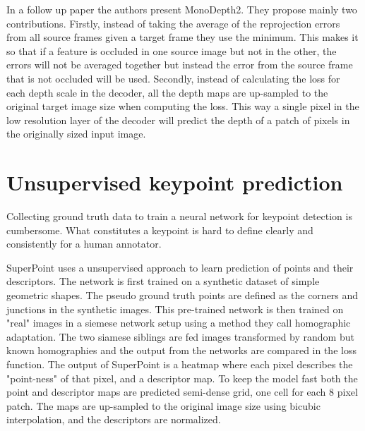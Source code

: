 
In a follow up paper\cite{monodepth2} the authors present MonoDepth2. They propose mainly two contributions. Firstly, instead of taking the average of the reprojection errors from all source frames given a target frame they use the minimum. This makes it so that if a feature is occluded in one source image but not in the other, the errors will not be averaged together but instead the error from the source frame that is not occluded will be used. Secondly, instead of calculating the loss for each depth scale in the decoder, all the depth maps are up-sampled to the original target image size when computing the loss. This way a single pixel in the low resolution layer of the decoder will predict the depth of a patch of pixels in the originally sized input image.

\section{Unsupervised keypoint prediction}

Collecting ground truth data to train a neural network for keypoint detection is cumbersome. What constitutes a keypoint is hard to define clearly and consistently for a human annotator.

SuperPoint\cite{superpoint} uses a unsupervised approach to learn prediction of points and their descriptors. The network is first trained on  a synthetic dataset of simple geometric shapes. The pseudo ground truth points are defined as the corners and junctions in the synthetic images. This pre-trained network is then trained on "real" images in a siemese network setup using a method they call homographic adaptation. The two siamese siblings are fed images transformed by random but known homographies and the output from the networks are compared in the loss function. The output of SuperPoint is a heatmap where each pixel describes the "point-ness" of that pixel, and a descriptor map. To keep the model fast both the point and descriptor maps are predicted semi-dense grid,
one cell for each 8 pixel patch. The maps are up-sampled to the original image size using bicubic interpolation, and the descriptors are normalized.

